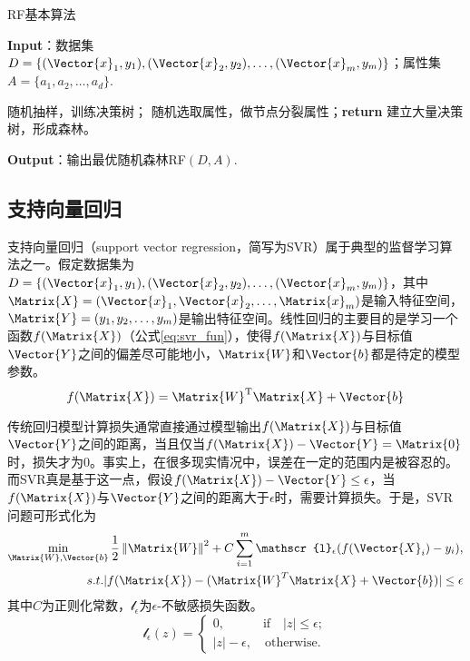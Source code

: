 \begin{algorithm}[!htbp]
  \small
  \caption{RF基本算法}\label{alg:random_forest}
  \textbf{Input}：{数据集$D=\{(\Vector{x}_1,y_1),(\Vector{x}_2,y_2),\ldots,(\Vector{x}_m,y_m)\}$；属性集$A=\{a_1,a_2,\ldots,a_d\}$.}
  \begin{algorithmic}[1]
    \State 随机抽样，训练决策树；
      \State 随机选取属性，做节点分裂属性；\textbf{return}
    \EndWhile
    \State 建立大量决策树，形成森林。
    \EndProcedure
  \end{algorithmic}
  \textbf{Output}：{输出最优随机森林RF$(D,A)$.}
\end{algorithm}


\subsection{支持向量回归}\label{sec:支持向量回归}

支持向量回归（support vector regression，简写为SVR）属于典型的监督学习算法之一。假定数据集为$D=\{(\Vector{x}_1,y_1),(\Vector{x}_2,y_2),\ldots,(\Vector{x}_m,y_m)\}$，其中$\Matrix{X}=(\Vector{x}_1,\Vector{x}_2,\ldots,\Matrix{x}_m)$是输入特征空间，$\Matrix{Y}=(y_1,y_2,\ldots,y_m)$是输出特征空间。线性回归的主要目的是学习一个函数$f(\Matrix{X})$（公式\ref{eq:svr_fun}），使得$f(\Matrix{X})$与目标值$\Vector{Y}$之间的偏差尽可能地小，$\Matrix{W}$和$\Vector{b}$都是待定的模型参数。
\begin{equation}
  \label{eq:svr_fun}
  f(\Matrix{X})=\Matrix{W}^{\text{T}}\Matrix{X}+\Vector{b}
\end{equation}

传统回归模型计算损失通常直接通过模型输出$f(\Matrix{X})$与目标值$\Vector{Y}$之间的距离，当且仅当$f(\Matrix{X})-\Vector{Y}=\Matrix{0}$时，损失才为0。事实上，在很多现实情况中，误差在一定的范围内是被容忍的。而SVR真是基于这一点，假设$f(\Matrix{X})-\Vector{Y}\le \epsilon$，当$f(\Matrix{X})$与$\Vector{Y}$之间的距离大于$\epsilon$时，需要计算损失。于是，SVR问题可形式化为
\begin{equation}
  \label{eq:svr_min}
  \begin{split}
  \min\limits_{\Matrix{W},\Vector{b}}\frac{1}{2}\left\|\Matrix{W}\right\|^{2}+C\sum_{i=1}^{m}\mathscr{l}_{\epsilon}(f(\Vector{X}_i)-y_i),\\
  s.t.  
  |f(\Matrix{X})-(\Matrix{W}^{T}\Matrix{X}+\Vector{b})|\le \epsilon
  \end{split}
\end{equation}
其中$C$为正则化常数，$\mathscr{l}_{\epsilon}$为$\epsilon$-不敏感损失函数。
\begin{equation}
  \label{eq:svr_loss}
  \mathscr{l}_{\epsilon}(z)=
  \begin{cases}
    0,\qquad\quad \text{if}\quad |z|\le \epsilon;\\
    |z|-\epsilon,\quad \text{otherwise}.
  \end{cases}
\end{equation}

